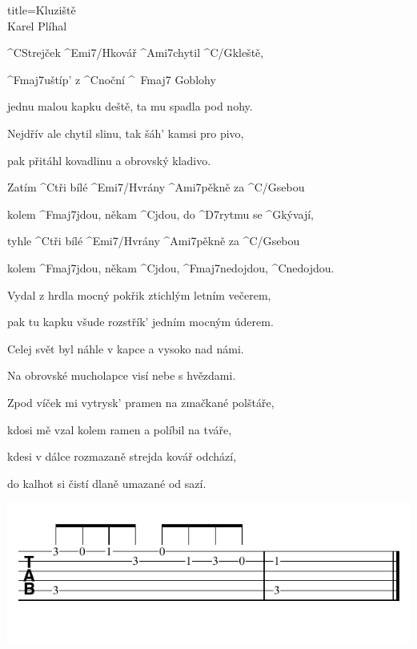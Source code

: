 \begin{song}{title=\predtitle\centering Kluziště \\\large Karel Plíhal \vspace*{-0.3cm}}  %
\begin{centerjustified}
\nejvetsi

\sloka 
	^{C{\z}}Strejček ^{Emi7/H}kovář ^{Ami7}chytil ^{C/G}kleště, 

	^{Fmaj7}uštíp' z ^{C}noční ^{\,\,\,Fmaj7\,\,G}oblohy
	
	jednu malou kapku deště, ta mu spadla pod nohy.
	
	Nejdřív ale chytil slinu, tak šáh' kamsi pro pivo,
	
	pak přitáhl kovadlinu a obrovský kladivo.

	Zatím ^{C}tři bílé ^{Emi7/H}vrány ^{Ami7}pěkně za ^{C/G}sebou
	
	kolem ^{Fmaj7}jdou, někam ^{C}jdou, do ^{D7}rytmu se ^{G}kývají,

	tyhle ^{C}tři bílé ^{Emi7/H}vrány ^{Ami7}pěkně za ^{C/G}sebou
	
	kolem ^{Fmaj7}jdou, někam ^{C}jdou, ^{Fmaj7}nedojdou, ^{C}nedojdou.


\sloka	
	Vydal z hrdla mocný pokřik ztichlým letním večerem,
	
	pak tu kapku všude rozstřík' jedním mocným úderem.
	
	Celej svět byl náhle v kapce a vysoko nad námi.
	
	Na obrovské mucholapce visí nebe s hvězdami.


\sloka
	Zpod víček mi vytrysk' pramen na zmačkané polštáře,
	
	kdosi mě vzal kolem ramen a políbil na tváře,
	
	kdesi v dálce rozmazaně strejda kovář odchází,
	
	do kalhot si čistí dlaně umazané od sazí. 


\end{centerjustified}

\centering
\includegraphics[scale=\defaulttabscale]{../taby/kluziste.pdf}

\setcounter{Slokočet}{0}
\end{song}
